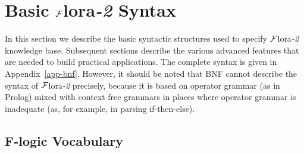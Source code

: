 \documentclass[11pt]{article}
\newcommand{\FLORA}{{\mbox{\sc ${\cal F}${lora}\rm\emph{-2}}}\xspace}
\newcommand{\FLSYSTEM}{\FLORA}
\newcommand{\fl}{\mbox{F-logic}\xspace}
\begin{document}
\section{Basic \FLSYSTEM Syntax}

In this section we describe the basic syntactic structures used to specify
\FLSYSTEM knowledge base. Subsequent sections describe the various advanced features
that are needed to build practical applications. The complete syntax is
given in Appendix~\ref{app-bnf}. However, it should be noted that BNF
cannot describe the syntax of \FLSYSTEM precisely, because it is based on
operator grammar (as in Prolog) mixed with context free grammars in
places where operator grammar is inadequate (as, for example, in parsing
if-then-else).

\subsection{\fl Vocabulary}\label{sec-basic-flogic}
\end{document}
